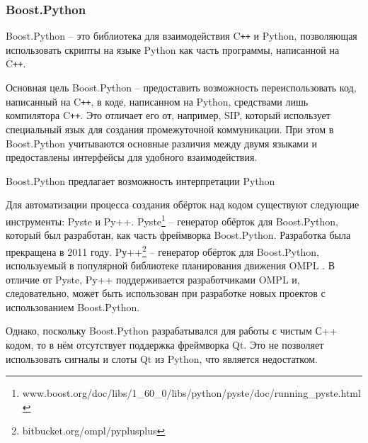 \documentclass[14pt]{matmex-diploma-custom}
\begin{document}
\subsubsection{Boost.Python}
Boost.Python \cite{abrahams2003boost} -- это библиотека для взаимодействия C\texttt{++} и Python, позволяющая использовать скрипты на языке Python как часть программы, написанной на C\texttt{++}. 

Основная цель Boost.Python -- предоставить возможность переиспользовать код, написанный на C\texttt{++}, в коде, написанном на Python, средствами лишь компилятора C\texttt{++}. Это отличает его от, например, SIP, который использует специальный язык для создания промежуточной коммуникации. При этом в Boost.Python учитываются основные различия между двумя языками и предоставлены интерфейсы для удобного взаимодействия.

Boost.Python предлагает возможность интерпретации Python 

Для автоматизации процесса создания обёрток над кодом существуют следующие инструменты: Pyste и Py++. Pyste\footnote{www.boost.org/doc/libs/1\_60\_0/libs/python/pyste/doc/running\_pyste.html} -- генератор обёрток для Boost.Python, который был разработан, как часть фреймворка Boost.Python. Разработка была прекращена в 2011 году. Pу++\footnote{bitbucket.org/ompl/pyplusplus} -- генератор обёрток для Boost.Python, используемый в популярной библиотеке планирования движения OMPL \cite{sucan2012theOMPL}. В отличие от Pyste, Py++ поддерживается разработчиками OMPL и, следовательно, может быть использован при разработке новых проектов с использованием Boost.Python.


Однако, поскольку Boost.Python разрабатывался для работы с чистым С++ кодом, то в нём отсутствует поддержка фреймворка Qt. Это не позволяет использовать сигналы и слоты Qt из Python, что является недостатком. 


\end{document}
